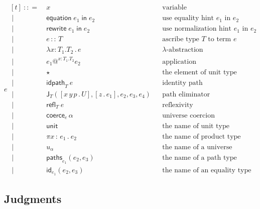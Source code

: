 \documentclass{article}
\makeatletter
\newcommand{\T}{T} %
\newcommand{\U}{U} %
\newcommand{\x}{x} %
\newcommand{\e}{e} %
\newcommand{\bnf}{\ \mathrel{{:}{:}{=}}\ }
\newcommand{\bnfor}{\ \mid\ \ }
\newcommand{\lam}[3]{\lambda #1 {:} #2.{#3}\,.\,} %
\newcommand{\app}[5]{#1\mathbin{@^{#2{:}#3.#4}} #5} %
\newcommand{\abst}[2]{[#1 \,.\, #2]} %
\newcommand{\ascribe}[2]{#1 \,{:}{:}\, #2} %
\newcommand{\unitTerm}{\star} %
\newcommand{\coerce}[2]{\mathsf{coerce}_{#1} \, #2}
\newcommand{\PrElim}[6]{\mathsf{J}_{#1}(#2, #3, #4, #5, #6)} %
\newcommand{\prRefl}[1]{{\mathsf{idpath}_{#1}}\ }  %
\newcommand{\juRefl}[1]{{\mathsf{refl}_{#1}}\ }    %
\newcommand{\nUnit}{\mathsf{unit}} %
\newcommand{\nProd}[2]{\pi #1\,{:}\,#2 \,.\ } %
\newcommand{\nUniverse}[1]{u_{#1}}  %
\newcommand{\nPrEqual}[3]{\mathsf{paths}_{#1}(#2,#3)} %
\newcommand{\nJuEqual}[3]{\mathsf{id}_{#1}(#2,#3)} %
\newcommand{\equationin}[1]{\mathsf{equation}\; #1 \; \mathsf{in} \;} %
\newcommand{\rewritein}[1]{\mathsf{rewrite}\; #1 \; \mathsf{in} \;} %
\makeatother
\begin{document}
\begin{equation*}
  \e
  \begin{aligned}[t]
    \bnf   {}&  \x   &&\text{variable} \\
    \bnfor {}&  \equationin{\e_1} e_2 &&\text{use equality hint $\e_1$ in $\e_2$} \\
    \bnfor {}&  \rewritein{\e_1} e_2 &&\text{use normalization hint $\e_1$ in $\e_2$} \\
    \bnfor {}&  \ascribe{\e}{\T}  &&\text{ascribe type $\T$ to term $\e$} \\
    \bnfor {}&  \lam{\x}{\T_1}{\T_2} \e  &&\text{$\lambda$-abstraction} \\
    \bnfor {}&  \app{\e_1}{\x}{\T_1}{\T_2}{\e_2}  &&\text{application} \\
    \bnfor {}&  \unitTerm  &&\text{the element of unit type} \\
    \bnfor {}&  \prRefl{\T}{\e}  &&\text{identity path} \\
    \bnfor {}&  \PrElim{\T}{\abst{x\,y\,p}{\U}}{\abst{z}{\e_1}}{\e_2}{\e_3}{\e_4}  &&\text{path eliminator} \\
    \bnfor {}&  \juRefl{\T} \e  &&\text{reflexivity} \\
    \bnfor {}&  \coerce{\e}{\alpha}  &&\text{universe coercion} \\
    \bnfor {}&  \nUnit  &&\text{the name of unit type} \\
    \bnfor {}&  \nProd{\x}{\e_1} \e_2  &&\text{the name of product type} \\
    \bnfor {}&  \nUniverse{\alpha} &&\text{the name of a universe} \\
    \bnfor {}&  \nPrEqual{\e_1}{\e_2}{\e_3}  &&\text{the name of a path type} \\
    \bnfor {}&  \nJuEqual{\e_1}{\e_2}{\e_3}  &&\text{the name of an equality type}
  \end{aligned}
\end{equation*}

\subsection{Judgments}
\label{sec:bidirectional-judgments}
\end{document}
